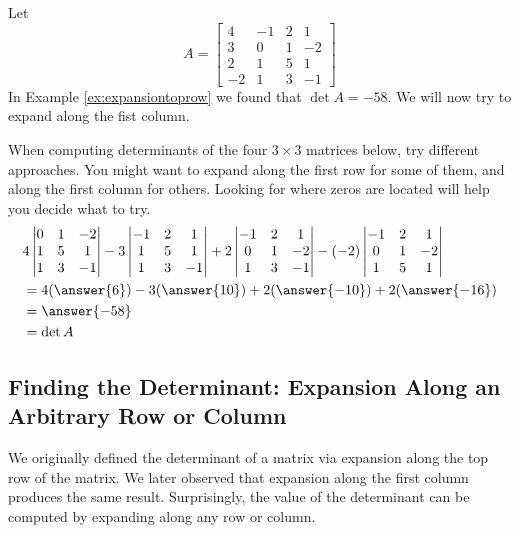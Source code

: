 \documentclass{ximera}
\begin{document}
\begin{exploration}\label{init:expansionfirstcol2}
Let
$$A=\begin{bmatrix}4&-1&2&1\\3&0&1&-2\\
2&1&5&1\\-2&1&3&-1\end{bmatrix}$$
In Example \ref{ex:expansiontoprow} we found that $\det{A}=-58$.  We will now try to expand along the fist column.  

When computing determinants of the four $3\times 3$ matrices below, try different approaches.  You might want to expand along the first row for some of them, and along the first column for others.  Looking for where zeros are located will help you decide what to try.
\begin{align*}
&4\begin{vmatrix}0&1&-2\\1&5&1\\1&3&-1\end{vmatrix}-3\begin{vmatrix}-1&2&1\\1&5&1\\1&3&-1\end{vmatrix}+2\begin{vmatrix}-1&2&1\\0&1&-2\\1&3&-1\end{vmatrix}-(-2)\begin{vmatrix}-1&2&1\\0&1&-2\\1&5&1\end{vmatrix}\\
&=4(\answer{6})-3(\answer{10})+2(\answer{-10})+2(\answer{-16})\\
&=\answer{-58}\\
&=\det{A}
\end{align*}
\end{exploration}

\subsection*{Finding the Determinant: Expansion Along an Arbitrary Row or Column}

We originally defined the determinant of a matrix via expansion along the top row of the matrix.  We later observed that expansion along the first column produces the same result.  Surprisingly, the value of the determinant can be computed by expanding along any row or column.  
\end{document}
